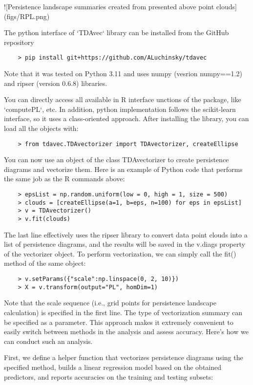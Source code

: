 \documentclass{article}
\begin{document}
![Persistence landscape summaries created from presented above point clouds\label{fig:PLs}](figs/RPL.png)

The python interface of `TDAvec` library can be installed from the GitHub repository

\begin{verbatim}
    > pip install git+https://github.com/ALuchinsky/tdavec
\end{verbatim}
Note that it was tested on Python 3.11 and uses numpy (vesrion numpy==1.2) and ripser (version 0.6.8) libraries.

You can directly access all available in R interface unctions of the package, like `computePL`, etc. In addition, python implementation follows the scikit-learn interface, so it uses a class-oriented approach. After installing the library, you can load all the objects with:

\begin{verbatim}
    > from tdavec.TDAvectorizer import TDAvectorizer, createEllipse
\end{verbatim}
You can now use an object of the class TDAvectorizer to create persistence diagrams and vectorize them. Here is an example of Python code that performs the same job as the R commands above:

\begin{verbatim}
    > epsList = np.random.uniform(low = 0, high = 1, size = 500)
    > clouds = [createEllipse(a=1, b=eps, n=100) for eps in epsList]
    > v = TDAvectorizer()
    > v.fit(clouds)
\end{verbatim}
The last line effectively uses the ripser library to convert data point clouds into a list of persistence diagrams, and the results will be saved in the v.diags property of the vectorizer object. To perform vectorization, we can simply call the fit() method of the same object:


\begin{verbatim}
    > v.setParams({"scale":np.linspace(0, 2, 10)})
    > X = v.transform(output="PL", homDim=1)
\end{verbatim}
Note that the scale sequence (i.e., grid points for persistence landscape calculation) is specified in the first line. The type of vectorization summary can be specified as a parameter. This approach makes it extremely convenient to easily switch between methods in the analysis and assess accuracy. Here's how we can conduct such an analysis.

First, we define a helper function that vectorizes persistence diagrams using the specified method, builds a linear regression model based on the obtained predictors, and reports accuracies on the training and testing subsets:
\end{document}
